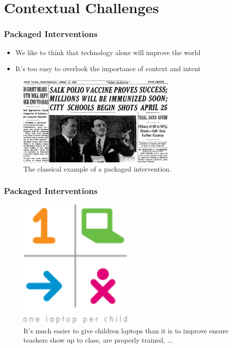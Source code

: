\documentclass[10pt,mathserif]{beamer}
\begin{document}
\section{Contextual Challenges}
\label{sec:label}

\begin{frame}
  \frametitle{Packaged Interventions}
  \begin{itemize}
  \item We like to think that technology alone will improve the world
  \item It's too easy to overlook the importance of context and intent
  \end{itemize}
  \begin{figure}[ht]
    \centering
    \includegraphics[width=0.7\textwidth]{figures/vaccine}
    \caption{The classical example of a packaged intervention. \label{fig:label}}
  \end{figure}
\end{frame}

\begin{frame}
  \frametitle{Packaged Interventions}
\begin{figure}[ht]
  \centering
  \includegraphics[width=0.5\textwidth]{figures/one_laptop}
  \caption{It's much easier to give children laptops than it is to improve
    ensure teachers show up to class, are properly trained, ... \label{fig:label} }
\end{figure}
\end{frame}
\end{document}
